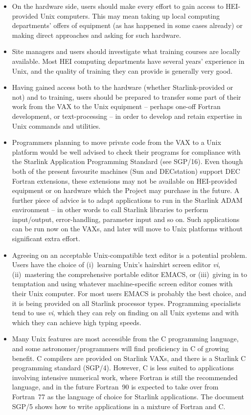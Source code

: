 \begin{itemize}
\item On the hardware side, users should make every effort to gain
access to HEI-provided Unix computers.  This may mean taking up local
computing departments' offers of equipment (as has happened in some
cases already) or making direct approaches and asking for such hardware.
\item Site managers and users should investigate what training courses
are locally available.  Most HEI computing departments have several
years' experience in Unix, and the quality of training they can provide
is generally very good.
\item Having gained access both to the hardware (whether
Starlink-provided or not) and to training, users should be prepared to
transfer some part of their work from the VAX to the Unix equipment --
perhaps one-off Fortran development, or text-processing -- in order to
develop and retain expertise in Unix commands and utilities.
\item Programmers planning to move private code from the VAX to a Unix
platform would be well advised to check their programs for compliance
with the Starlink Application Programming Standard (see SGP/16).  Even
though both of the present favourite machines (Sun and DECstation)
support DEC Fortran extensions, these extensions may not be available on
HEI-provided equipment or on hardware which the Project may purchase in
the future.  A further piece of advice is to adapt applications to run
in the Starlink ADAM environment -- in other words to call Starlink
libraries to perform input/output, error-handling, parameter input and
so on.  Such applications can be run now on the VAXs, and later will
move to Unix platforms without significant extra effort.
\item Agreeing on an acceptable Unix-compatible text editor is a
potential problem.  Users have the choice of (i)~learning Unix's
hairshirt screen editor {\it vi}, (ii)~mastering the comprehensive
portable editor EMACS, or (iii)~giving in to temptation and using
whatever machine-specific screen editor comes with their Unix computer.
For most users EMACS is probably the best choice, and it is being provided
on all Starlink processor types.  Programming specialists tend to use
{\it vi}, which they can rely on finding on all Unix systems and with
which they can achieve high typing speeds.
\item Many Unix features are most accessible from the C programming
language, and some astronomer/programmers will find proficiency in C of
growing benefit.  C compilers are provided on Starlink VAXs, and there
is a Starlink C programming standard (SGP/4).  However, C is less suited
to applications involving intensive numerical work, where Fortran is
still the recommended language, and in the future Fortran~90 is expected
to take over from Fortran~77 as the language of choice for Starlink
applications.  The document SGP/5 shows how to write applications in a
mixture of Fortran and C.
\end{itemize}

